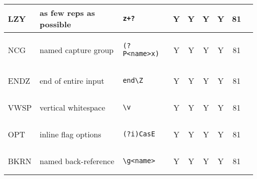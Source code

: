 \begin{xtabular}{lllcccccc}
\midrule
LZY & as few reps as possible &
\begin{minipage}{0.5in}\begin{verbatim}
z+?
\end{verbatim}\end{minipage} & Y & Y & Y & Y & 81\\
\midrule
NCG & named capture group &
\begin{minipage}{0.5in}\begin{verbatim}
(?P<name>x)
\end{verbatim}\end{minipage} & Y & Y & Y & Y & 81\\
\midrule
ENDZ & end of entire input &
\begin{minipage}{0.5in}\begin{verbatim}
end\Z
\end{verbatim}\end{minipage} & Y & Y & Y & Y & 81\\
\midrule
VWSP & vertical whitespace &
\begin{minipage}{0.5in}\begin{verbatim}
\v
\end{verbatim}\end{minipage} & Y & Y & Y & Y & 81\\
\midrule
OPT & inline flag options &
\begin{minipage}{0.5in}\begin{verbatim}
(?i)CasE
\end{verbatim}\end{minipage} & Y & Y & Y & Y & 81\\
\midrule
BKRN & named back-reference &
\begin{minipage}{0.5in}\begin{verbatim}
\g<name>
\end{verbatim}\end{minipage} & Y & Y & Y & Y & 81\\
\end{xtabular}

